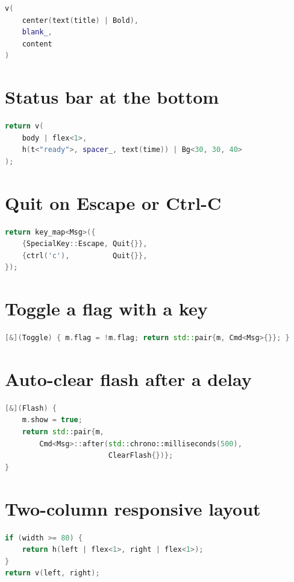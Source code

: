 \begin{lstlisting}[language=C++]
v(
    center(text(title) | Bold),
    blank_,
    content
)
\end{lstlisting}

\section{Status bar at the bottom}

\begin{lstlisting}[language=C++]
return v(
    body | flex<1>,
    h(t<"ready">, spacer_, text(time)) | Bg<30, 30, 40>
);
\end{lstlisting}

\section{Quit on Escape or Ctrl-C}

\begin{lstlisting}[language=C++]
return key_map<Msg>({
    {SpecialKey::Escape, Quit{}},
    {ctrl('c'),          Quit{}},
});
\end{lstlisting}

\section{Toggle a flag with a key}

\begin{lstlisting}[language=C++]
[&](Toggle) { m.flag = !m.flag; return std::pair{m, Cmd<Msg>{}}; }
\end{lstlisting}

\section{Auto-clear flash after a delay}

\begin{lstlisting}[language=C++]
[&](Flash) {
    m.show = true;
    return std::pair{m,
        Cmd<Msg>::after(std::chrono::milliseconds(500),
                        ClearFlash{})};
}
\end{lstlisting}

\section{Two-column responsive layout}

\begin{lstlisting}[language=C++]
if (width >= 80) {
    return h(left | flex<1>, right | flex<1>);
}
return v(left, right);
\end{lstlisting}

